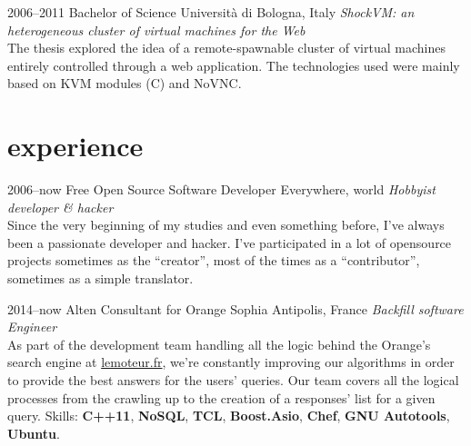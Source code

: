 \documentclass[]{friggeri-cv}
\begin{document}
\begin{entrylist}
  \entry
      {2006--2011}
      {Bachelor {\normalfont of Science}}
      {Universit\`a di Bologna, Italy}
      {\emph{ShockVM: an heterogeneous cluster of virtual machines for the Web}
        \\
        The thesis explored the idea of a remote-spawnable cluster of virtual
        machines entirely controlled through a web application.  The
        technologies used were mainly based on KVM modules (C) and NoVNC.}
\end{entrylist}


\section{experience}

\begin{entrylist}
  \entry
      {2006--now}
      {Free Open Source Software Developer}
      {Everywhere, world}
      {\emph{Hobbyist developer \& hacker} \\
        Since the very beginning of my studies and even something before, I've
        always been a passionate developer and hacker.  I've participated in a
        lot of opensource projects sometimes as the ``creator'', most of the
        times as a ``contributor'', sometimes as a simple translator.}
\end{entrylist}

\begin{entrylist}
  \entry
      {2014--now}
      {Alten Consultant for Orange}
      {Sophia Antipolis, France}
      {\emph{Backfill software Engineer} \\
        As part of the development team handling all the logic behind the
        Orange's search engine at \href{http://lemoteur.fr}{lemoteur.fr}, we're
        constantly improving our algorithms in order to provide the best answers
        for the users' queries. Our team covers all the logical processes from
        the crawling up to the creation of a responses' list for a given query.
        Skills: \textbf{C++11}, \textbf{NoSQL}, \textbf{TCL},
        \textbf{Boost.Asio}, \textbf{Chef}, \textbf{GNU Autotools},
        \textbf{Ubuntu}.
      }
\end{entrylist}
\end{document}
